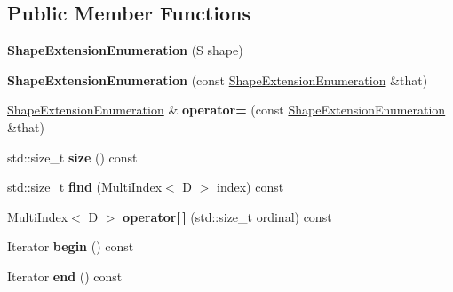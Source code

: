 \subsection*{Public Member Functions}
\begin{DoxyCompactItemize}
\item 
\hypertarget{classwaveblocks_1_1_shape_extension_enumeration_a4162a6b0024f247c0d26cfa2f84ef48c}{}{\bfseries Shape\+Extension\+Enumeration} (S shape)\label{classwaveblocks_1_1_shape_extension_enumeration_a4162a6b0024f247c0d26cfa2f84ef48c}

\item 
\hypertarget{classwaveblocks_1_1_shape_extension_enumeration_a063ff056516d79f8dba15eff2c96f740}{}{\bfseries Shape\+Extension\+Enumeration} (const \hyperlink{classwaveblocks_1_1_shape_extension_enumeration}{Shape\+Extension\+Enumeration} \&that)\label{classwaveblocks_1_1_shape_extension_enumeration_a063ff056516d79f8dba15eff2c96f740}

\item 
\hypertarget{classwaveblocks_1_1_shape_extension_enumeration_a1e7aa102629b723b7cf82024f80a24e0}{}\hyperlink{classwaveblocks_1_1_shape_extension_enumeration}{Shape\+Extension\+Enumeration} \& {\bfseries operator=} (const \hyperlink{classwaveblocks_1_1_shape_extension_enumeration}{Shape\+Extension\+Enumeration} \&that)\label{classwaveblocks_1_1_shape_extension_enumeration_a1e7aa102629b723b7cf82024f80a24e0}

\item 
\hypertarget{classwaveblocks_1_1_shape_extension_enumeration_af7feb054bebc01467ab94e05d776faf4}{}std\+::size\+\_\+t {\bfseries size} () const \label{classwaveblocks_1_1_shape_extension_enumeration_af7feb054bebc01467ab94e05d776faf4}

\item 
\hypertarget{classwaveblocks_1_1_shape_extension_enumeration_a436a73d6cf125e6b04bdcc04cea7b39c}{}std\+::size\+\_\+t {\bfseries find} (Multi\+Index$<$ D $>$ index) const \label{classwaveblocks_1_1_shape_extension_enumeration_a436a73d6cf125e6b04bdcc04cea7b39c}

\item 
\hypertarget{classwaveblocks_1_1_shape_extension_enumeration_abf04924f58894849ee311837d47c028c}{}Multi\+Index$<$ D $>$ {\bfseries operator\mbox{[}$\,$\mbox{]}} (std\+::size\+\_\+t ordinal) const \label{classwaveblocks_1_1_shape_extension_enumeration_abf04924f58894849ee311837d47c028c}

\item 
\hypertarget{classwaveblocks_1_1_shape_extension_enumeration_ac1b44cb4e86f97c5e63af11a5f761493}{}Iterator {\bfseries begin} () const \label{classwaveblocks_1_1_shape_extension_enumeration_ac1b44cb4e86f97c5e63af11a5f761493}

\item 
\hypertarget{classwaveblocks_1_1_shape_extension_enumeration_ab7b524f76fcb40f6208bd676ad1724d8}{}Iterator {\bfseries end} () const \label{classwaveblocks_1_1_shape_extension_enumeration_ab7b524f76fcb40f6208bd676ad1724d8}

\end{DoxyCompactItemize}


